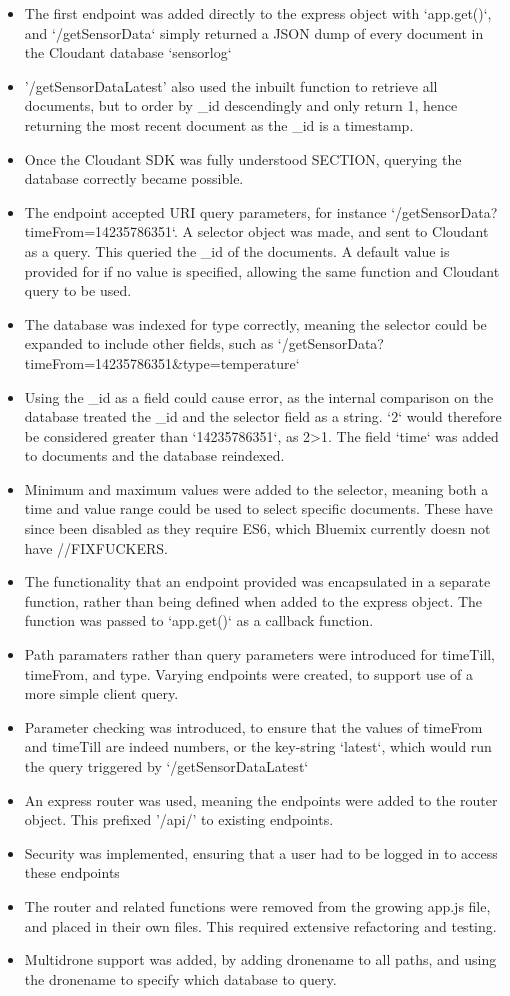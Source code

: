 \documentclass{article}
\begin{document}
\begin{itemize}
	\item The first endpoint was added directly to the express object with `app.get()`, and `/getSensorData` simply returned a JSON dump of every document in the Cloudant database `sensorlog`
	\item '/getSensorDataLatest' also used the inbuilt function to retrieve all documents, but to order by \_id descendingly and only return 1, hence returning the most recent document as the \_id is a timestamp. 
	\item Once the Cloudant SDK was fully understood SECTION, querying the database correctly became possible.
	\item The endpoint accepted URI query parameters, for instance `/getSensorData?timeFrom=14235786351`. A selector object was made, and sent to Cloudant as a query. This queried the \_id of the documents. A default value is provided for if no value is specified, allowing the same function and Cloudant query to be used.
	\item The database was indexed for type correctly, meaning the selector could be expanded to include other fields, such as `/getSensorData?timeFrom=14235786351\&type=temperature`
	\item Using the \_id as a field could cause error, as the internal comparison on the database treated the \_id and the selector field as a string. `2` would therefore be considered greater than `14235786351`, as 2\textgreater 1. The field `time` was added to documents and the database reindexed.
	\item Minimum and maximum values were added to the selector, meaning both a time and value range could be used to select specific documents. These have since been disabled as they require ES6, which Bluemix currently doesn not have //FIXFUCKERS.
	\item The functionality that an endpoint provided was encapsulated in a separate function, rather than being defined when added to the express object. The function was passed to `app.get()` as a callback function.
	\item Path paramaters rather than query parameters were introduced for timeTill, timeFrom, and type. Varying endpoints were created, to support use of a more simple client query. 
	\item Parameter checking was introduced, to ensure that the values of timeFrom and timeTill are indeed numbers, or the key-string `latest`, which would run the query triggered by `/getSensorDataLatest`
	\item An express router was used, meaning the endpoints were added to the router object. This prefixed '/api/' to existing endpoints. 
	\item Security was implemented, ensuring that a user had to be logged in to access these endpoints
	\item The router and related functions were removed from the growing app.js file, and placed in their own files. This required extensive refactoring and testing.
	\item Multidrone support was added, by adding dronename to all paths, and using the dronename to specify which database to query.
\end{itemize}
\end{document}
